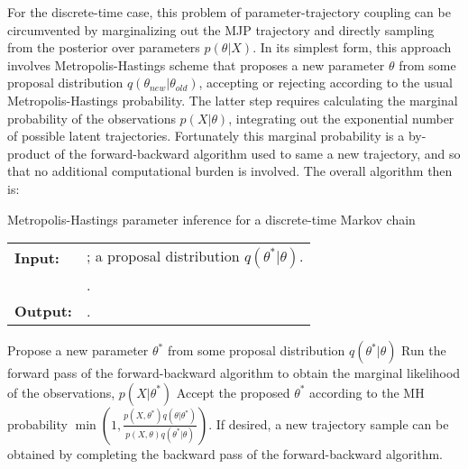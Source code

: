 For the discrete-time case, this problem of parameter-trajectory
coupling can be circumvented by marginalizing out the MJP trajectory 
and directly sampling from the posterior over parameters $p(\theta|X)$.
In its simplest form, this approach involves Metropolis-Hastings
scheme that proposes a new parameter $\theta$ from some proposal distribution 
$q(\theta_{new}|\theta_{old})$, accepting or rejecting according to the usual
Metropolis-Hastings probability. The latter step requires calculating the 
marginal probability of the observations $p(X|\theta)$, integrating out
the exponential number of possible latent trajectories. Fortunately
this marginal probability is a by-product of the forward-backward
algorithm used to same a new trajectory, and so that no 
additional computational burden is involved. The overall algorithm then is:

\begin{algorithm}[H]
  \caption{Metropolis-Hastings parameter inference for a discrete-time 
Markov chain}
   \label{alg:disc_time_mh}
  \begin{tabular}{l l}
   \textbf{Input:  } & \text{A set of partial and noisy observations $X$};
    a proposal distribution $q(\theta^*|\theta)$. \\
  & \text{The previous Markov chain parameters $\theta$}.\\
  \textbf{Output:  }& \text{A new Markov chain parameter $\theta^*$}.\\
   \hline
   \end{tabular}
   \begin{algorithmic}[1]
  \State Propose a new parameter $\theta^*$ from some proposal distribution
    $q(\theta^*|\theta)$
  \State Run the forward pass of the forward-backward algorithm to 
    obtain the marginal likelihood of the observations, $p(X|\theta^*)$
  \State Accept the proposed $\theta^*$ according to the MH probability 
    $\min(1,\frac{p(X,\theta^*)q(\theta|\theta^*)}{p(X,\theta)q(\theta^*|\theta)})$.
  \State If desired, a new trajectory sample can be obtained by
    completing the backward pass of the forward-backward algorithm.
\end{algorithmic}
\end{algorithm}

